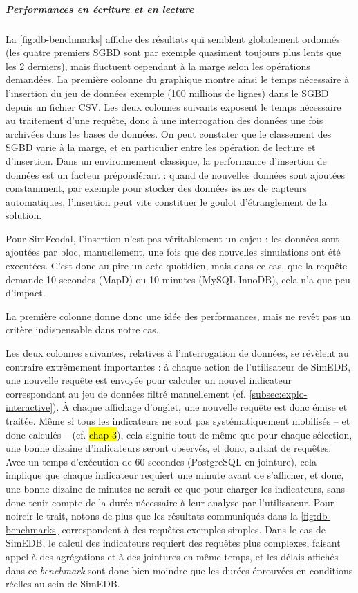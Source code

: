 			
			\subparagraph{Performances en écriture et en lecture}
			
			La \cref{fig:db-benchmarks} affiche des résultats qui semblent globalement ordonnés (les quatre premiers SGBD sont par exemple quasiment toujours plus lents que les 2 derniers), mais fluctuent cependant à la marge selon les opérations demandées.
			La première colonne du graphique montre ainsi le temps nécessaire à l'insertion du jeu de données exemple (100 millions de lignes) dans le SGBD depuis un fichier CSV.
			Les deux colonnes suivants exposent le temps nécessaire au traitement d'une requête, donc à une interrogation des données une fois archivées dans les bases de données.
			On peut constater que le classement des SGBD varie à la marge, et en particulier entre les opération de lecture et d'insertion.
			Dans un environnement classique, la performance d'insertion de données est un facteur prépondérant : quand de nouvelles données sont ajoutées constamment, par exemple pour stocker des données issues de capteurs automatiques, l'insertion peut vite constituer le goulot d'étranglement de la solution.
			
			Pour SimFeodal, l'insertion n'est pas véritablement un enjeu : les données sont ajoutées par bloc, manuellement, une fois que des nouvelles simulations ont été executées.
			C'est donc au pire un acte quotidien, mais dans ce cas, que la requête demande 10 secondes (MapD) ou 10 minutes (MySQL InnoDB), cela n'a que peu d'impact.
			
			La première colonne donne donc une idée des performances, mais ne revêt pas un critère indispensable dans notre cas.
			
			Les deux colonnes suivantes, relatives à l'interrogation de données, se révèlent au contraire extrêmement importantes : à chaque action de l'utilisateur de SimEDB, une nouvelle requête est envoyée pour calculer un nouvel indicateur correspondant au jeu de données filtré manuellement (cf. \cref{subsec:explo-interactive}).
			À chaque affichage d'onglet, une nouvelle requête est donc émise et traitée. Même si tous les indicateurs ne sont pas systématiquement mobilisés -- et donc calculés -- (cf. \hl{chap 3}), cela signifie tout de même que pour chaque sélection, une bonne dizaine d'indicateurs seront observés, et donc, autant de requêtes.
			Avec un temps d'exécution de 60 secondes (PostgreSQL en \og jointure\fg{}), cela implique que chaque indicateur requiert une minute avant de s'afficher, et donc, une bonne dizaine de minutes ne serait-ce que pour charger les indicateurs, sans donc tenir compte de la durée nécessaire à leur analyse par l'utilisateur.
			Pour noircir le trait, notons de plus que les résultats communiqués dans la \cref{fig:db-benchmarks} correspondent à des requêtes exemples simples.
			Dans le cas de SimEDB, le calcul des indicateurs requiert des requêtes plus complexes, faisant appel à des agrégations et à des jointures en même temps, et les délais affichés dans ce \textit{benchmark} sont donc bien moindre que les durées éprouvées en conditions réelles au sein de SimEDB.
			
